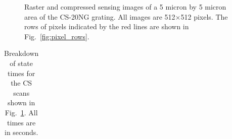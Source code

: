 \documentclass[journal]{IEEEtran}
\begin{document}
%     
\begin{figure}
  \parbox{.1\textwidth}{\phantom{p}}
  \begin{subfigure}{.8\textwidth}
  
\end{subfigure}
\begin{subfigure}[t]{.09\textwidth}
  \vspace{-18.2em}
    
  \end{subfigure}
  \caption{Raster and compressed sensing images of a 5 micron by 5 micron 
    area of the CS-20NG grating. All images are 512$\times$512 pixels.
    The rows of pixels indicated by the red lines are
    shown in Fig.~\ref{fig:pixel_rows}.}
  \label{fig:resultsF1_images}
\end{figure}

%   

%     

\begin{table}[t!]
  \centering
  \caption{Breakdown of state times for the CS scans shown in
    Fig.~\ref{fig:resultsF1_images}. All times are in seconds.}
  \label{tab:final_state_times}
  \begin{tabular}{ccccccc}
    
  \end{tabular}
\end{table}
\end{document}
